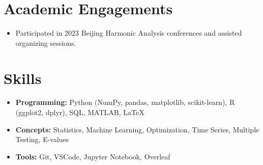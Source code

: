 \documentclass[a4paper,11pt]{article}
\begin{document}
\section*{Academic Engagements}
\begin{itemize}
  \item Participated in 2023 Beijing Harmonic Analysis conferences and assisted organizing sessions.
\end{itemize}

\section*{Skills}
\begin{itemize}[leftmargin=*]
  \item \textbf{Programming:} Python (NumPy, pandas, matplotlib, scikit-learn), R (ggplot2, dplyr), SQL, MATLAB, \LaTeX
  \item \textbf{Concepts:} Statistics, Machine Learning, Optimization, Time Series, Multiple Testing, E-values
  \item \textbf{Tools:} Git, VSCode, Jupyter Notebook, Overleaf
\end{itemize}
\end{document}
